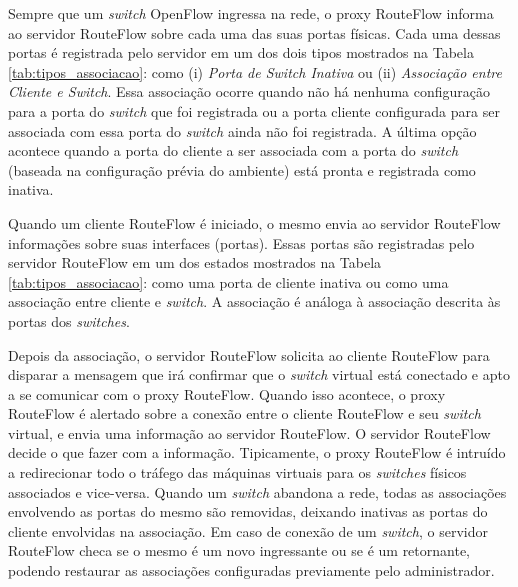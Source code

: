 Sempre que um \textit{switch} OpenFlow ingressa na rede, o proxy RouteFlow
informa ao servidor RouteFlow sobre cada uma das suas
portas físicas. Cada uma dessas portas é registrada pelo servidor
em um dos dois tipos mostrados na Tabela \ref{tab:tipos_associacao}:
como (i) \textit{Porta de Switch Inativa} ou (ii) \textit{Associação
entre Cliente e Switch}. Essa associação ocorre quando 
não há nenhuma configuração para a porta do \textit{switch} que
foi registrada ou a porta cliente configurada para ser associada
com essa porta do \textit{switch} ainda não foi registrada. A última 
opção acontece quando a porta do cliente a ser associada com a
porta do \textit{switch} (baseada na configuração prévia do ambiente)
está pronta e registrada como inativa.

Quando um cliente RouteFlow é iniciado, o mesmo envia ao servidor RouteFlow 
informações sobre suas interfaces (portas). Essas portas são 
registradas pelo servidor RouteFlow em um dos estados mostrados na
Tabela \ref{tab:tipos_associacao}: como uma porta de cliente
inativa ou como uma associação entre cliente e \textit{switch}. A 
associação é análoga à associação descrita às portas dos
\textit{switches}.

Depois da associação, o servidor RouteFlow solicita ao cliente RouteFlow para
disparar a mensagem que irá confirmar que o \textit{switch} virtual está
conectado e apto a se comunicar com o proxy RouteFlow. Quando isso
acontece, o proxy RouteFlow é alertado sobre a conexão entre o 
cliente RouteFlow e seu \textit{switch} virtual, e envia uma informação ao 
servidor RouteFlow. O servidor RouteFlow decide o que fazer com a informação.
Tipicamente, o proxy RouteFlow é intruído a redirecionar todo o tráfego
das máquinas virtuais para os \textit{switches} físicos associados e 
vice-versa. Quando um \textit{switch} abandona a rede, todas as 
associações envolvendo as portas do mesmo são removidas,
deixando inativas as portas do cliente envolvidas na associação.
Em caso de conexão de um \textit{switch}, o servidor RouteFlow checa se o 
mesmo é um novo ingressante ou se é um retornante, podendo
 restaurar as associações configuradas previamente 
pelo administrador.


